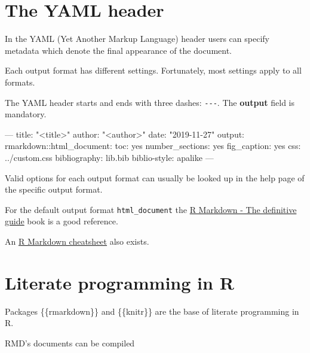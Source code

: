\documentclass[]{book}
\newenvironment{Shaded}{}{}
\newcommand{\AttributeTok}[1]{#1}
\newcommand{\FunctionTok}[1]{#1}
\newcommand{\OtherTok}[1]{\textcolor[rgb]{1.00,0.25,0.00}{#1}}
\newcommand{\StringTok}[1]{\textcolor[rgb]{0.00,0.50,0.50}{#1}}
\begin{document}
\hypertarget{the-yaml-header}{%
\section{The YAML header}\label{the-yaml-header}}

In the YAML (Yet Another Markup Language) header users can specify metadata which denote the final appearance of the document.

Each output format has different settings.
Fortunately, most settings apply to all formats.

The YAML header starts and ends with three dashes: \texttt{-\/-\/-}.
The \textbf{output} field is mandatory.

\begin{Shaded}
\begin{Highlighting}[]
\OtherTok{---}
\FunctionTok{title:}\AttributeTok{ }\StringTok{"<title>"}
\FunctionTok{author:}\AttributeTok{ }\StringTok{"<author>"}
\FunctionTok{date:}\AttributeTok{ }\StringTok{"2019-11-27"}
\FunctionTok{output:}
  \FunctionTok{rmarkdown:}\AttributeTok{:html_document:}
    \FunctionTok{toc:}\AttributeTok{ yes}
    \FunctionTok{number_sections:}\AttributeTok{ yes}
    \FunctionTok{fig_caption:}\AttributeTok{ yes}
    \FunctionTok{css:}\AttributeTok{ ../custom.css}
\FunctionTok{bibliography:}\AttributeTok{ lib.bib}
\FunctionTok{biblio-style:}\AttributeTok{ apalike}
\OtherTok{---}
\end{Highlighting}
\end{Shaded}

Valid options for each output format can usually be looked up in the help page of the specific output format.

For the default output format \texttt{html\_document} the \href{https://bookdown.org/yihui/rmarkdown/html-document.html}{R Markdown - The definitive guide} book is a good reference.

An \href{https://rstudio.com/wp-content/uploads/2016/03/rmarkdown-cheatsheet-2.0.pdf}{R Markdown cheatsheet} also exists.

\hypertarget{literate-programming-in-r}{%
\section{Literate programming in R}\label{literate-programming-in-r}}

Packages \{\{rmarkdown\}\} and \{\{knitr\}\} are the base of literate programming in R.

RMD's documents can be compiled
\end{document}
